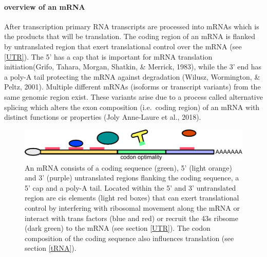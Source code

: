 \documentclass[12pt,openany]{book}
\begin{document}
\paragraph{overview of an mRNA}

After transcription primary RNA transcripts are processed into mRNAs
which is the products that will be translation. The coding region of an
mRNA is flanked by untranslated region that exert translational control
over the mRNA (see \ref{UTR}). The 5' has a cap that is important for
mRNA translation initiation(Grifo, Tahara, Morgan, Shatkin, \& Merrick,
1983), while the 3' end has a poly-A tail protecting the mRNA against
degradation (Wilusz, Wormington, \& Peltz, 2001). Multiple different
mRNAs (isoforms or transcript variants) from the same genomic region
exist. These variants arise due to a process called alternative splicing
which alters the exon composition (i.e.~coding region) of an mRNA with
distinct functions or properties (Joly Anne-Laure et al., 2018).

\begin{figure}
  \includegraphics{./figures/UTRFeatures.pdf}
  \caption{ An mRNA consists of a coding sequence (green), 5' (light orange) and 3' (purple) untranslated regions flanking the coding sequence, a 5' cap and a poly-A tail. Located within the 5' and 3' untranslated region are cis elements (light red boxes) that can exert translational control by interfering with ribosomal movement along the mRNA or interact with trans factors (blue and red) or recruit the 43s ribsome (dark green) to the mRNA (see section \ref{UTR}). The codon composition of the coding sequence also influences translation (see section \ref{tRNA}).   
 \label{fig:UTRFeat}}
\end{figure}
\end{document}
